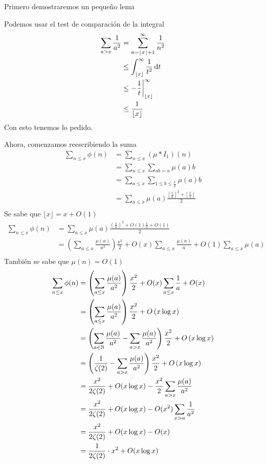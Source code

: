 \begin{sol}
    Primero demostraremos un pequeño lema
    \begin{lem}[$\sum_{a>x}\frac{1}{a^2}=O(x^{-1})$]
        Podemos usar el test de comparación de la integral
        \begin{align*}
            \sum_{a>x}\frac{1}{a^2}&=\sum_{n=\left\lfloor x\right\rfloor+1}^\infty\frac{1}{n^2}\\
            &\leq\int_{\left\lfloor x\right\rfloor}^\infty\frac{1}{t^2}\operatorname{d}\!{t}\\
            &\leq-\frac{1}{t}\bigg\rvert_{\left\lfloor x\right\rfloor}^\infty\\
            &\leq\frac{1}{\left\lfloor x\right\rfloor}
        \end{align*}
        Con esto tenemos lo pedido.
    \end{lem}
    Ahora, comenzamos reescribiendo la suma
    \begin{align*}
        \sum_{n\leq x}\phi(n)&=\sum_{n\leq x}(\mu*I_1)(n)\\
        &=\sum_{n\leq x}\sum_{ab=n}\mu(a)b\\
        &=\sum_{a\leq x}\sum_{1\leq b\leq \frac{x}{a}}\mu(a)b\\
        &=\sum_{a\leq x}\mu(a)\frac{\left\lfloor\frac{x}{a}\right\rfloor^2+\left\lfloor\frac{x}{a}\right\rfloor}{2}\\
    \end{align*}
    Se sabe que $\lfloor x\rfloor=x+O(1)$
    \begin{align*}
        \sum_{n\leq x}\phi(n)&=\sum_{a\leq x}\mu(a)\frac{(\frac{x}{a})^2+O(1)\frac{x}{a}+O(1)}{2}\\
        &=\left(\sum_{a\leq x}\frac{\mu(a)}{a^2}\right)\frac{x^2}{2}+O(x)\sum_{a\leq x}\frac{\mu(a)}{a}+O(1)\sum_{a\leq x}\mu(a)\\
    \end{align*}
    También se sabe que $\mu(n)=O(1)$
    \begin{align*}
        \sum_{n\leq x}\phi(n)&=\left(\sum_{a\leq x}\frac{\mu(a)}{a^2}\right)\frac{x^2}{2}+O(x)\sum_{a\leq x}\frac{1}{a}+O(x)\\
        &=\left(\sum_{a\leq x}\frac{\mu(a)}{a^2}\right)\frac{x^2}{2}+O\left(x\log x\right)\\
        &=\left(\sum_{a\in\mathbb{N}}\frac{\mu(a)}{a^2}-\sum_{a>x}\frac{\mu(a)}{a^2}\right)\frac{x^2}{2}+O\left(x\log x\right)\\
        &=\left(\frac{1}{\zeta(2)}-\sum_{a>x}\frac{\mu(a)}{a^2}\right)\frac{x^2}{2}+O\left(x\log x\right)\\
        &=\frac{x^2}{2\zeta(2)}+O(x\log x)-\frac{x^2}{2}\sum_{a>x}\frac{\mu(a)}{a^2}\\
        &=\frac{x^2}{2\zeta(2)}+O(x\log x)-O(x^2)\sum_{x>a}\frac{1}{a^2}\\
        &=\frac{x^2}{2\zeta(2)}+O(x\log x)-O(x)\\
        &=\frac{1}{2\zeta(2)} \cdot x^2 +O(x\log x)
    \end{align*}
\end{sol}

